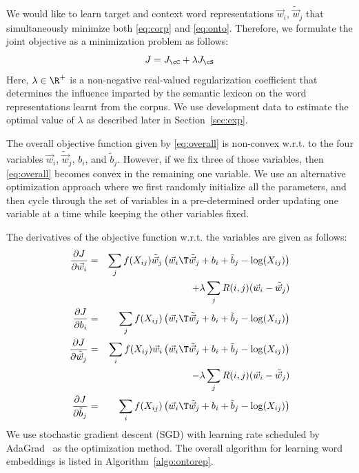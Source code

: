\documentclass[letterpaper]{article}
\newcommand{\citep}{\cite}
\begin{document}
We would like to learn target and context word representations  $\vec{w}_i$, $\tilde{\vec{w}}_j$
that simultaneously minimize both \eqref{eq:corp} and \eqref{eq:onto}.
Therefore, we formulate the joint objective as a minimization problem as follows:
\begin{equation}
\small
\label{eq:overall}
J = J_{\cC} + \lambda J_{\cS}
\end{equation}
Here, $\lambda \in \R^+$ is a non-negative real-valued regularization coefficient that determines
the influence imparted by the semantic lexicon on the word representations learnt from the corpus.
We use development data to estimate the optimal value of $\lambda$ as described later in Section~\ref{sec:exp}.

The overall objective function given by \eqref{eq:overall} is non-convex w.r.t. to the four variables $\vec{w}_i$, $\tilde{\vec{w}}_j$, $b_i$, and
$\tilde{b}_j$. However, if we fix three of those variables, then \eqref{eq:overall} becomes convex in the remaining one variable.
We use an alternative optimization approach where we first randomly initialize all the parameters, and then cycle through the set of variables
in a pre-determined order updating one variable at a time while keeping the other variables fixed.

The derivatives of the objective function w.r.t. the variables are given as follows:
{\small
\begin{align}
\label{eq:part:wi}
\frac{\partial J}{\partial \vec{w}_i} &=&   \sum_j f(X_{ij}) \tilde{\vec{w}}_j \left(\vec{w}_i\T\tilde{\vec{w}}_j +b_i + \tilde{b}_j  - \log(X_{ij}) \right) \nonumber \\
& & + \lambda \sum_j R(i,j) (\vec{w}_i - \tilde{\vec{w}}_j)	\\
\label{eq:part:bi}
\frac{\partial J}{\partial b_i} &=&   \sum_j f(X_{ij}) \left(\vec{w}_i\T\tilde{\vec{w}}_j +b_i + \tilde{b}_j  - \log(X_{ij}) \right) 	\\
\label{eq:part:wj}
\frac{\partial J}{\partial \tilde{\vec{w}}_j} &=&  \sum_i f(X_{ij}) \vec{w}_i \left(\vec{w}_i\T\tilde{\vec{w}}_j +b_i + \tilde{b}_j  - \log(X_{ij}) \right) \nonumber \\
& &	- \lambda \sum_j R(i,j) (\vec{w}_i - \tilde{\vec{w}}_j)	\\
\label{eq:part:bj}
\frac{\partial J}{\partial \tilde{b}_j} &=&   \sum_i f(X_{ij}) \left(\vec{w}_i\T\tilde{\vec{w}}_j +b_i + \tilde{b}_j  - \log(X_{ij}) \right)
\end{align}
}
We use stochastic gradient descent (SGD) with learning rate scheduled by
AdaGrad~\citep{Duchi:JMLR:2011} as the optimization method.
The overall algorithm for learning word embeddings is listed in Algorithm~\ref{algo:ontorep}.
\end{document}
